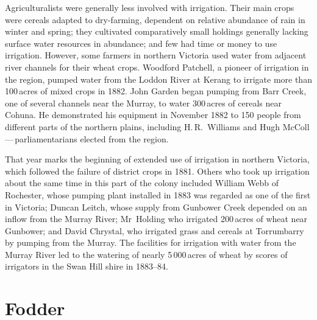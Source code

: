 Agriculturalists were generally less involved with irrigation. Their
ma\-in crops were cereals adapted to dry-farming, dependent on
relative abundance of rain in winter and spring; they cultivated
comparatively small holdings generally lacking surface water resources
in abundance; and few had time or money to use irrigation.  However,
some farmers in northern Victoria used water from adjacent river
channels for their wh\-eat crops.  Woodford Patchell,  a pioneer of irrigation in the region, pumped water from the
Loddon River  at Kerang  
to irrigate more than 100\,acres of mixed crops in 1882. John Garden
 began pumping from Barr Creek, 
one of several channels near the
Murray, to water 300\,acres of cereals near Cohuna. He demonstrated his equipment in November 1882 to 150 people
from different parts of the northern plains, including H.\,R.~Williams
 and  Hugh
McColl\,---\,parliamentarians elected from the region.

That year marks the beginning of extended use of irrigation in
northern Victoria, which followed the failure of district crops in
1881. Others who took up irrigation about the same time in this part
of the colony included William Webb  of Rochester,
whose pumping plant installed in 1883 was
regarded as one of the first in Victoria; Duncan Leitch,
 whose supply from Gunbower Creek
 depended on an inflow from the Murray River;
 Mr~Holding who irrigated 200\,acres of
wheat near Gunbower; and David Chrystal,  who irrigated grass and cereals at Torrumbarry
  by pumping from the Murray. The facilities
for irrigation with water from the Murray River led to the watering of
nearly 5\,000\,acres of wheat by scores of irrigators in the Swan Hill
  shire in
1883--84.

\section*{Fodder}

